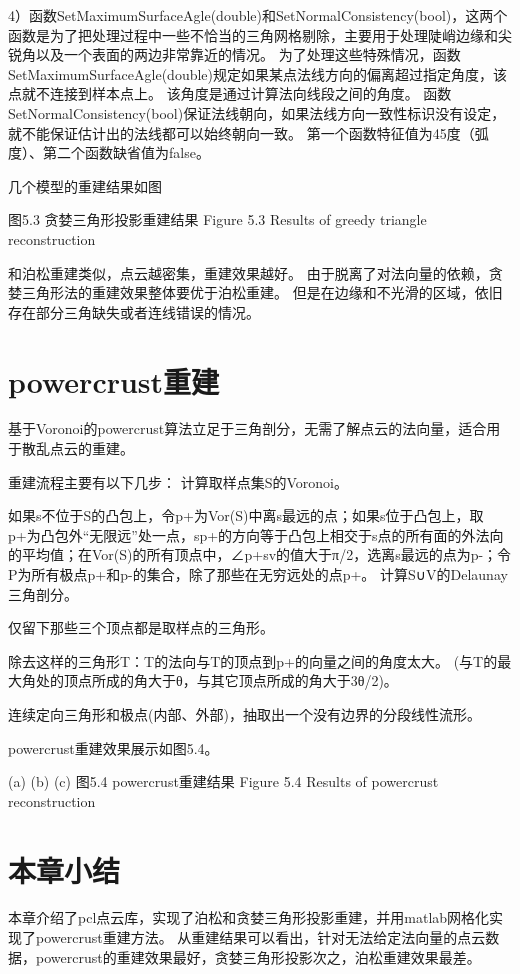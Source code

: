 4）函数SetMaximumSurfaceAgle(double)和SetNormalConsistency(bool)，这两个函数是为了把处理过程中一些不恰当的三角网格剔除，主要用于处理陡峭边缘和尖锐角以及一个表面的两边非常靠近的情况。
为了处理这些特殊情况，函数SetMaximumSurfaceAgle(double)规定如果某点法线方向的偏离超过指定角度，该点就不连接到样本点上。
该角度是通过计算法向线段之间的角度。
函数SetNormalConsistency(bool)保证法线朝向，如果法线方向一致性标识没有设定，就不能保证估计出的法线都可以始终朝向一致。
第一个函数特征值为45度（弧度）、第二个函数缺省值为false。

几个模型的重建结果如图

 
图5.3  贪婪三角形投影重建结果
Figure 5.3 Results of greedy triangle reconstruction

和泊松重建类似，点云越密集，重建效果越好。
由于脱离了对法向量的依赖，贪婪三角形法的重建效果整体要优于泊松重建。
但是在边缘和不光滑的区域，依旧存在部分三角缺失或者连线错误的情况。

\section{powercrust重建}
基于Voronoi的powercrust算法立足于三角剖分，无需了解点云的法向量，适合用于散乱点云的重建。

重建流程主要有以下几步：
计算取样点集S的Voronoi。

如果s不位于S的凸包上，令p+为Vor(S)中离s最远的点；如果s位于凸包上，取p+为凸包外“无限远”处一点，sp+的方向等于凸包上相交于s点的所有面的外法向的平均值；在Vor(S)的所有顶点中，∠p+sv的值大于π/2，选离s最远的点为p-；令P为所有极点p+和p-的集合，除了那些在无穷远处的点p+。
计算S∪V的Delaunay三角剖分。

仅留下那些三个顶点都是取样点的三角形。

除去这样的三角形T：T的法向与T的顶点到p+的向量之间的角度太大。
(与T的最大角处的顶点所成的角大于θ，与其它顶点所成的角大于3θ/2)。

连续定向三角形和极点(内部、外部)，抽取出一个没有边界的分段线性流形。

powercrust重建效果展示如图5.4。


 
(a)                   (b)                   (c)
图5.4  powercrust重建结果
Figure 5.4 Results of powercrust reconstruction

\section{本章小结}
本章介绍了pcl点云库，实现了泊松和贪婪三角形投影重建，并用matlab网格化实现了powercrust重建方法。
从重建结果可以看出，针对无法给定法向量的点云数据，powercrust的重建效果最好，贪婪三角形投影次之，泊松重建效果最差。

